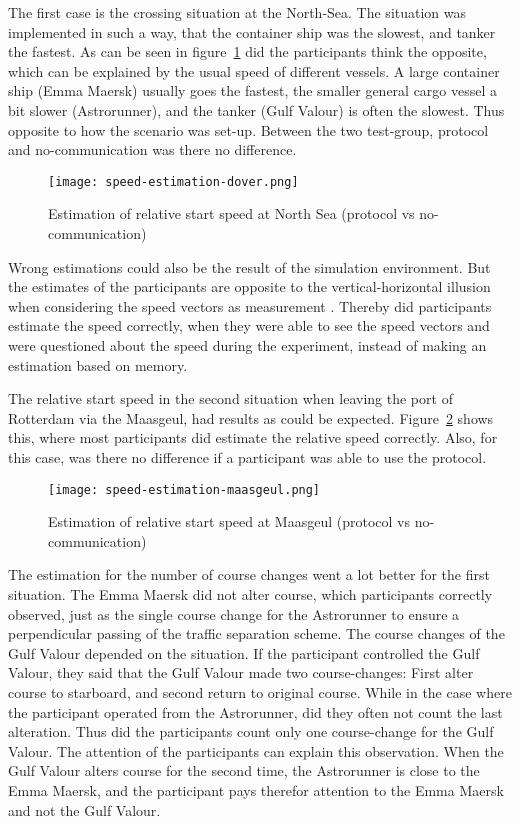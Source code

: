 The first case is the crossing situation at the North-Sea. The situation was implemented in such a way, that the container ship was the slowest, and tanker the fastest. As can be seen in figure~\ref{fig:speed-estimation-dover} did the participants think the opposite, which can be explained by the usual speed of different vessels. A large container ship (Emma Maersk) usually goes the fastest, the smaller general cargo vessel a bit slower (Astrorunner), and the tanker (Gulf Valour) is often the slowest. Thus opposite to how the scenario was set-up. Between the two test-group, protocol and no-communication was there no difference.

\begin{figure}[h]
	\centering
	\texttt{[image: speed-estimation-dover.png]}
	\caption{Estimation of relative start speed at North Sea (protocol vs no-communication)}
	\label{fig:speed-estimation-dover}
\end{figure}

Wrong estimations could also be the result of the simulation environment. But the estimates of the participants are opposite to the vertical-horizontal illusion when considering the speed vectors as measurement \cite{Prinzmetal1993}. Thereby did participants estimate the speed correctly, when they were able to see the speed vectors and were questioned about the speed during the experiment, instead of making an estimation based on memory.

The relative start speed in the second situation when leaving the port of Rotterdam via the Maasgeul, had results as could be expected. Figure~\ref{fig:speed-estimation-maasgeul} shows this, where most participants did estimate the relative speed correctly. Also, for this case, was there no difference if a participant was able to use the protocol.

\begin{figure}[h]
	\centering
	\texttt{[image: speed-estimation-maasgeul.png]}
	\caption{Estimation of relative start speed at Maasgeul (protocol vs no-communication)}
	\label{fig:speed-estimation-maasgeul}
\end{figure}

The estimation for the number of course changes went a lot better for the first situation. The Emma Maersk did not alter course, which participants correctly observed, just as the single course change for the Astrorunner to ensure a perpendicular passing of the traffic separation scheme. The course changes of the Gulf Valour depended on the situation. If the participant controlled the Gulf Valour, they said that the Gulf Valour made two course-changes: First alter course to starboard, and second return to original course. While in the case where the participant operated from the Astrorunner, did they often not count the last alteration. Thus did the participants count only one course-change for the Gulf Valour. The attention of the participants can explain this observation. When the Gulf Valour alters course for the second time, the Astrorunner is close to the Emma Maersk, and the participant pays therefor attention to the Emma Maersk and not the Gulf Valour.

